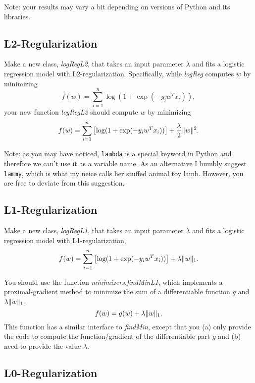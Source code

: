\documentclass{article}
\begin{document}
Note: your results may vary a bit depending on versions of Python and its libraries.


\subsection{L2-Regularization}

Make a new class, \emph{logRegL2}, that takes an input parameter $\lambda$ and fits a logistic regression model with L2-regularization. Specifically, while \emph{logReg} computes $w$ by minimizing
\[
f(w) = \sum_{i=1}^n \log(1+\exp(-y_iw^Tx_i)),
\]
your new function \emph{logRegL2} should compute $w$ by minimizing
\[
f(w) = \sum_{i=1}^n \left[\log(1+\exp(-y_iw^Tx_i))\right] + \frac{\lambda}{2}\|w\|^2.
\]

Note: as you may have noticed, \texttt{lambda} is a special keyword in Python and therefore we can't use it as a variable name.
As an alternative I humbly suggest \texttt{lammy}, which is what my neice calls her stuffed animal toy lamb.
However, you are free to deviate from this suggestion.

\subsection{L1-Regularization}

Make a new class, \emph{logRegL1}, that takes an input parameter $\lambda$ and fits a logistic regression model with L1-regularization,
\[
f(w) = \sum_{i=1}^n \left[\log(1+\exp(-y_iw^Tx_i))\right] + \lambda\|w\|_1.
\]


You should use the function \emph{minimizers.findMinL1}, which implements a
proximal-gradient method to minimize the sum of a differentiable function $g$ and $\lambda\|w\|_1$,
\[
f(w) = g(w) + \lambda \|w\|_1.
\]
This function has a similar interface to \emph{findMin}, except that you (a)
only provide the code to compute the function/gradient of the differentiable
part $g$ and (b) need to provide the value $\lambda$.


\subsection{L0-Regularization}
\end{document}
